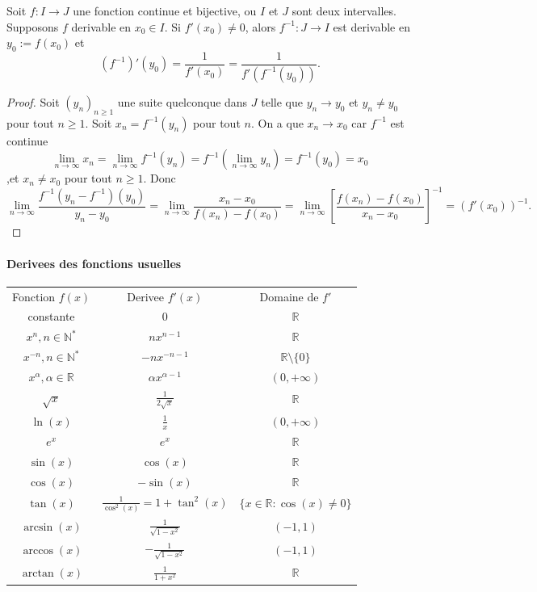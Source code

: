 \begin{theorem}
Soit $f:I\to J$ une fonction continue et bijective, ou $I$ et $J$ sont deux intervalles. Supposons $f$ derivable en $x_{0}\in I$. Si $f'(x_{0})\neq 0$, alors $f^{-1}:J\to I$ est derivable en $y_{0}:=f(x_{0})$ et
$$
(f^{-1})'(y_{0})=\frac{1}{f'(x_{0})}=\frac{1}{f'(f^{-1}(y_{0}))}.
$$
\end{theorem}
\begin{proof}
Soit $(y_{n})_{n\ge 1}$ une suite quelconque dans $J$ telle que $y_{n}\to y_{0}$ et $y_{n}\neq y_{0}$ pour tout $n\ge 1$. Soit $x_{n}=f^{-1}(y_{n})$ pour tout $n$. On a que $x_{n}\to x_{0}$ car $f^{-1}$ est continue 
$$
\lim_{ n \to \infty } x_{n}=\lim_{ n \to \infty } f^{-1}(y_{n})=f^{-1}(\lim_{ n \to \infty } y_{n})=f^{-1}(y_{0})=x_{0}
$$
,et $x_{n}\neq x_{0}$ pour tout $n\ge 1$. Donc
$$
\lim_{ n \to \infty } \frac{f^{-1}(y_{n}-f^{-1})(y_{0})}{y_{n}-y_{0}}=\lim_{ n \to \infty } \frac{x_{n}-x_{0}}{f(x_{n})-f(x_{0})}=\lim_{ n \to \infty } \left[ \frac{f(x_{n})-f(x_{0})}{x_{n}-x_{0}} \right]^{-1}=(f'(x_{0}))^{-1}.
$$
\end{proof}
\paragraph{Derivees des fonctions usuelles}
\begin{center}
\begin{tabular}{ |c|c|c| }
\hline 
Fonction $f(x)$ & Derivee $f'(x)$ & Domaine de $f'$ \\
constante & 0 & $\mathbb{R}$ \\
$x^{n},n\in \mathbb{N}^{*}$ & $nx^{n-1}$ & $\mathbb{R}$ \\
$x^{-n},n\in \mathbb{N}^{*}$ & $-nx^{-n-1}$ & $\mathbb{R}\setminus \{ 0 \}$ \\
$x^{\alpha},\alpha \in \mathbb{R}$ & $\alpha x^{\alpha -1}$ & $(0,+\infty)$ \\
$\sqrt{ x }$ & $\frac{1}{2\sqrt{ x }}$ & $\mathbb{R}$ \\
$\ln(x)$ & $\frac{1}{x}$ & $(0,+\infty)$ \\ 
$e^{x}$ & $e^{x}$ & $\mathbb{R}$ \\
$\sin(x)$ & $\cos(x)$ & $\mathbb{R}$ \\
$\cos(x)$ & $-\sin(x)$ & $\mathbb{R}$ \\
$\tan(x)$ & $\frac{1}{\cos ^{2}(x)}=1+\tan ^{2}(x)$ & $\{ x \in \mathbb{R}:\cos(x)\neq 0 \}$ \\
$\arcsin(x)$ & $\frac{1}{\sqrt{ 1-x^{2} }}$ & $(-1,1)$ \\
$\arccos(x)$ & $-\frac{1}{\sqrt{ 1-x^{2} }}$ & $(-1,1)$ \\
$\arctan(x)$ & $\frac{1}{1+x^{2}}$ & $\mathbb{R}$ \\
\hline
\end{tabular}
\end{center}

